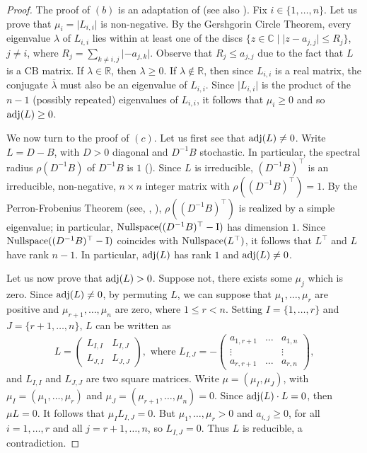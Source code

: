 \documentclass[ALCO]{cedram}
\newcommand{\mbr}{\mbox{$\mathbb{R}$}}
\newcommand{\mbc}{\mbox{$\mathbb{C}$}}
\newcommand{\cb}{\mbox{$\mathrm{CB}$}}
\newcommand{\I}{\mbox{${\rm I}$}}
\newcommand{\nulls}{\mbox{${\rm Nullspace}$}}
\newcommand{\adj}{\mbox{${\rm adj}$}}
\begin{document}
\begin{proof}
The proof of $(b)$ is an adaptation of \cite[Lemma~2.1]{op} (see also
\cite[Theorem~6.3,~$(c)$]{opv}). Fix $i\in\{1,\ldots ,n\}$. Let us
prove that $\mu_{i}=\lvert L_{i,i}\rvert$ is non-negative.  By the
Gershgorin Circle Theorem, every eigenvalue $\lambda$ of $L_{i,i}$
lies within at least one of the discs $\{z\in\mbc\mid \lvert
z-a_{j,j}\rvert\leq R_{j}\}$, $j\neq i$, where $R_{j}=\sum_{k\neq
  i,j}\lvert -a_{j,k}\rvert$. Observe that $R_{j}\leq a_{j,j}$ due to
the fact that $L$ is a $\cb$ matrix. If $\lambda\in\mbr$, then
$\lambda\geq 0$. If $\lambda\not\in \mbr$, then since $L_{i,i}$ is a
real matrix, the conjugate $\overline{\lambda}$ must also be an
eigenvalue of $L_{i,i}$. Since $\lvert L_{i,i}\rvert$ is the product
of the $n-1$ (possibly repeated) eigenvalues of $L_{i,i}$, it follows
that $\mu_i\geq 0$ and so $\adj(L)\geq 0$.

We now turn to the proof of $(c)$. Let us first see that $\adj(L)\neq
0$. Write $L=D-B$, with $D>0$ diagonal and $D^{-1}B$ stochastic. In
particular, the spectral radius $\rho(D^{-1}B)$ of $D^{-1}B$ is $1$
(\cite[Chapter~XIII,~p.~83]{gantmacher}). Since $L$ is irreducible,
$(D^{-1}B)^{\top}$ is an irreducible, non-negative, $n\times n$
integer matrix with $\rho((D^{-1}B)^{\top})=1$. By the
Perron-Frobenius Theorem (see, \eg
\cite[Chapter~XIII,~p.~53]{gantmacher},
\cite[Theorem~8.8.1,~p.~178]{gr}), $\rho((D^{-1}B)^{\top})$ is
realized by a simple eigenvalue; in particular,
$\nulls((D^{-1}B)^{\top}-\I)$ has dimension $1$. Since
$\nulls((D^{-1}B)^{\top}-\I)$ coincides with $\nulls(L^{\top})$, it
follows that $L^{\top}$ and $L$ have rank $n-1$. In particular,
$\adj(L)$ has rank $1$ and $\adj(L)\neq 0$.

Let us now prove that $\adj(L)>0$. Suppose not, \ie there exists
some $\mu_j$ which is zero. Since $\adj(L)\neq 0$, by permuting $L$,
we can suppose that $\mu_1,\ldots ,\mu_r$ are positive and
$\mu_{r+1},\ldots ,\mu_n$ are zero, where $1\leq r<n$. Setting
$I=\{1,\ldots ,r\}$ and $J=\{r+1,\ldots ,n\}$, $L$ can be written as
\begin{eqnarray*}
L=\left(\begin{array}{cc}
L_{I,I}&L_{I,J}\\L_{J,I}&L_{J,J}
\end{array}\right),\mbox{ where }
L_{I,J}=-\left(\begin{array}{ccc}
a_{1,r+1}&\ldots &a_{1,n}\\\vdots&&\vdots\\a_{r,r+1}&\ldots &a_{r,n}
\end{array}\right),
\end{eqnarray*}
and $L_{I,I}$ and $L_{J,J}$ are two square matrices. Write
$\mu=(\mu_I,\mu_J)$, with $\mu_I=(\mu_1,\ldots ,\mu_r)$ and
$\mu_J=(\mu_{r+1},\ldots ,\mu_n)=0$. Since $\adj(L)\cdot L=0$, then
$\mu L=0$. It follows that $\mu_IL_{I,J}=0$. But $\mu_1,\ldots
,\mu_r>0$ and $a_{i,j}\geq 0$, for all $i=1,\ldots ,r$ and all
$j=r+1,\ldots, n$, so $L_{I,J}=0$. Thus $L$ is reducible, a
contradiction.
\end{proof}
\end{document}
